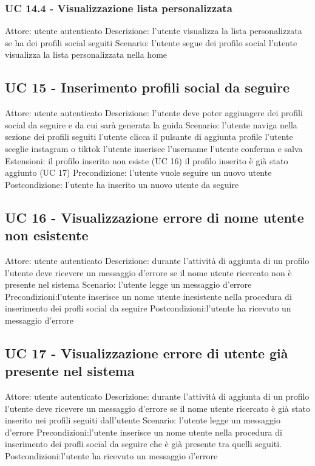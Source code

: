 \subsubsection{UC 14.4 - Visualizzazione lista personalizzata}
Attore: utente autenticato
Descrizione: l’utente visualizza la lista personalizzata se ha dei profili social seguiti
Scenario:
l’utente segue dei profilo social
l’utente visualizza la lista personalizzata nella home

\subsection{UC 15 - Inserimento profili social da seguire}
Attore: utente autenticato
Descrizione: l’utente deve poter aggiungere dei profili social da seguire e da cui sarà generata la guida
Scenario:
l’utente naviga nella sezione dei profili seguiti
l’utente clicca il pulsante di aggiunta profile
l’utente sceglie instagram o tiktok
l’utente inserisce l’username
l’utente conferma e salva
Estensioni:
il profilo inserito non esiste (UC 16)
il profilo inserito è già stato aggiunto (UC 17)
Precondizione: l’utente vuole seguire un nuovo utente
Postcondizione: l’utente ha inserito un nuovo utente da seguire


\subsection{UC 16 - Visualizzazione errore di nome utente non esistente}
Attore: utente autenticato
Descrizione: durante l’attività di aggiunta di un profilo l’utente deve ricevere un messaggio d’errore se il nome utente ricercato non è presente nel sistema
Scenario: l’utente legge un messaggio d’errore
Precondizioni:l’utente inserisce un nome utente inesistente nella procedura di inserimento dei profli social da seguire
Postcondizioni:l’utente ha ricevuto un messaggio d’errore

\subsection{UC 17 - Visualizzazione errore di utente già presente nel sistema}
Attore: utente autenticato
Descrizione: durante l’attività di aggiunta di un profilo l’utente deve ricevere un messaggio d’errore se il nome utente ricercato è già stato inserito nei profili seguiti dall’utente
Scenario: l’utente legge un messaggio d’errore
Precondizioni:l’utente inserisce un nome utente nella procedura di inserimento dei profli social da seguire che è già presente tra quelli seguiti.
Postcondizioni:l’utente ha ricevuto un messaggio d’errore

